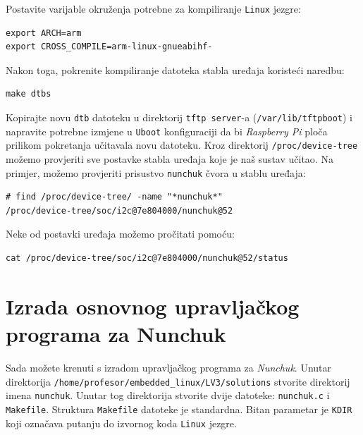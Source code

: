 \documentclass[11pt]{article}
\begin{document}
Postavite varijable okruženja potrebne za kompiliranje \texttt{Linux} jezgre:
\begin{lstlisting}
export ARCH=arm
export CROSS_COMPILE=arm-linux-gnueabihf-
\end{lstlisting}
Nakon toga, pokrenite kompiliranje datoteka stabla uređaja koristeći naredbu:
\begin{lstlisting}
make dtbs
\end{lstlisting}
Kopirajte novu \texttt{dtb} datoteku u direktorij \texttt{tftp server}-a
(\texttt{/var/lib/tftpboot}) i napravite potrebne izmjene u \texttt{Uboot}
konfiguraciji da bi \textit{Raspberry Pi} ploča prilikom pokretanja učitavala
novu datoteku.
\newline
\newline
Kroz direktorij \texttt{/proc/device-tree} možemo provjeriti sve postavke
stabla uređaja koje je naš sustav učitao.
\newline
\newline
Na primjer, možemo provjeriti prisustvo \texttt{nunchuk} čvora u stablu uređaja:
\begin{lstlisting}
# find /proc/device-tree/ -name "*nunchuk*"
/proc/device-tree/soc/i2c@7e804000/nunchuk@52
\end{lstlisting}
Neke od postavki uređaja možemo pročitati pomoću:
\begin{lstlisting}
cat /proc/device-tree/soc/i2c@7e804000/nunchuk@52/status
\end{lstlisting}

\section{Izrada osnovnog upravljačkog programa za Nunchuk}
Sada možete krenuti s izradom upravljačkog programa za \textit{Nunchuk}.
Unutar direktorija \texttt{/home/profesor/embedded\_linux/LV3/solutions} stvorite
direktorij imena \texttt{nunchuk}. Unutar tog direktorija stvorite dvije
datoteke: \texttt{nunchuk.c} i \texttt{Makefile}.
\newline
\newline
Struktura \texttt{Makefile} datoteke je standardna. Bitan parametar je
\texttt{KDIR} koji označava putanju do izvornog koda \texttt{Linux} jezgre.
\newline
\newline
\end{document}
